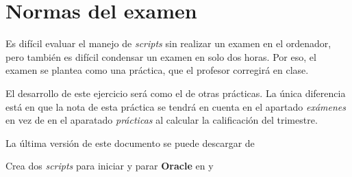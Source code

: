 
\usepackage{eurosym}


\renewcommand{\hmwkClass}{Automatización de tareas}
\renewcommand{\hmwkTitle}{Examen de \textit{scripts} de \textit{shell}}


\usepackage{blindtext}








\primerapagina

\setlength{\parindent}{0em}
\setlength{\parskip}{1em}

\section{Normas del examen}
Es difícil evaluar el manejo de \textit{scripts} sin realizar un examen en el ordenador, pero también es difícil condensar un examen en solo dos horas. Por eso, el examen se plantea como una práctica, que el profesor corregirá en clase.

El desarrollo de este ejercicio será como el de otras prácticas. La única diferencia está en que la nota de esta práctica se tendrá en cuenta en el apartado \textit{exámenes} en vez de en el aparatado \textit{prácticas} al calcular la calificación del trimestre.

La última versión de este documento se puede descargar de 




\begin{homeworkProblem}

  Crea dos \textit{scripts} para iniciar y parar \textbf{Oracle} en  y 
  
\end{homeworkProblem}

